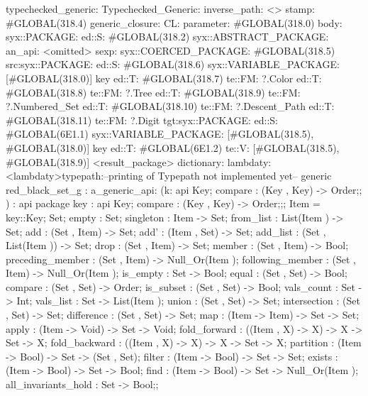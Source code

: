 typechecked_generic:
Typechecked_Generic:
inverse_path: <>
stamp: #GLOBAL(318.4)
generic_closure:
CL:
parameter: #GLOBAL(318.0)
body: syx::PACKAGE:
        ed::S: #GLOBAL(318.2)
            syx::ABSTRACT_PACKAGE:
                an_api: <omitted>
                sexp:
                    syx::COERCED_PACKAGE:
                        #GLOBAL(318.5)
                         src:syx::PACKAGE:
                                ed::S: #GLOBAL(318.6) syx::VARIABLE_PACKAGE: [#GLOBAL(318.0)] key
                                ed::T: #GLOBAL(318.7) te::FM: ?.Color
                                ed::T: #GLOBAL(318.8) te::FM: ?.Tree
                                ed::T: #GLOBAL(318.9) te::FM: ?.Numbered_Set
                                ed::T: #GLOBAL(318.10) te::FM: ?.Descent_Path
                                ed::T: #GLOBAL(318.11) te::FM: ?.Digit
                        tgt:syx::PACKAGE:
                            ed::S: #GLOBAL(6E1.1)
                             syx::VARIABLE_PACKAGE:
                             [#GLOBAL(318.5), #GLOBAL(318.0)]
                             key
                            ed::T: #GLOBAL(6E1.2)
                             te::V:
                             [#GLOBAL(318.5), #GLOBAL(318.9)]
         <result_package>
dictionary:
lambdaty:
  <lambdaty>typepath:--printing of Typepath not implemented yet--
generic red_black_set_g
:
a_generic_api:
(k:
api {
    Key;
    compare : (Key , Key) -> Order;};
)
:
api {   package key
          : api {
                Key;
                compare : (Key , Key) -> Order;};;
    Item  = key::Key;
    Set;
    empty : Set;
    singleton : Item -> Set;
    from_list : List(Item ) -> Set;
    add : (Set , Item) -> Set;
    add' : (Item , Set) -> Set;
    add_list : (Set , List(Item )) -> Set;
    drop : (Set , Item) -> Set;
    member : (Set , Item) -> Bool;
    preceding_member : (Set , Item) -> Null_Or(Item );
    following_member : (Set , Item) -> Null_Or(Item );
    is_empty : Set -> Bool;
    equal : (Set , Set) -> Bool;
    compare : (Set , Set) -> Order;
    is_subset : (Set , Set) -> Bool;
    vals_count : Set -> Int;
    vals_list : Set -> List(Item );
    union : (Set , Set) -> Set;
    intersection : (Set , Set) -> Set;
    difference : (Set , Set) -> Set;
    map : (Item -> Item) -> Set -> Set;
    apply : (Item -> Void) -> Set -> Void;
    fold_forward : ((Item , X) -> X) -> X -> Set -> X;
    fold_backward : ((Item , X) -> X) -> X -> Set -> X;
    partition : (Item -> Bool) -> Set -> (Set , Set);
    filter : (Item -> Bool) -> Set -> Set;
    exists : (Item -> Bool) -> Set -> Bool;
    find : (Item -> Bool) -> Set -> Null_Or(Item );
    all_invariants_hold : Set -> Bool;};
